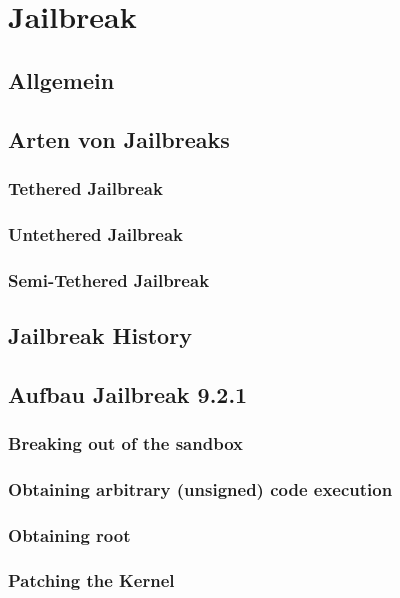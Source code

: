 %
%
% 
% 
% 


\chapter{Jailbreak}
\label{ch:JB}

\section{Allgemein}
\label{sec:JBAllgemein}

\section{Arten von Jailbreaks}
\label{sec:JBArten}

\subsection{Tethered Jailbreak}
\label{sec:JBTethered}

\subsection{Untethered Jailbreak}
\label{sec:JBUnTethered}

\subsection{Semi-Tethered Jailbreak}
\label{sec:JBSemiTethered}

\section{Jailbreak History}
\label{sec:JBHistory}

\section{Aufbau Jailbreak 9.2.1}
\label{sec:JBAufbau}

\subsection{Breaking out of the sandbox}
\label{sec:JBStep1}

\subsection{Obtaining arbitrary (unsigned) code execution}
\cite{TaiG[1]}
\cite{TaiG[2]}
\cite{TaiG[3]}

\label{sec:JBStep2}

\subsection{Obtaining root}
\label{sec:JBStep3}

\subsection{Patching the Kernel}
\label{sec:JBStep4}
